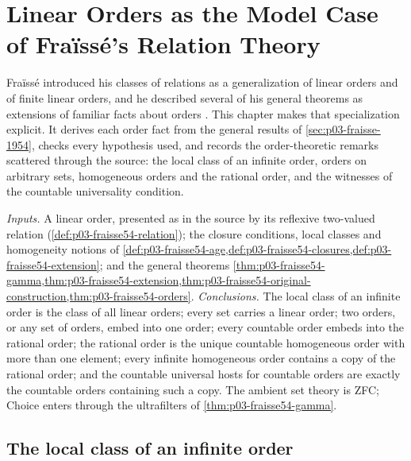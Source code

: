 \chapter{Linear Orders as the Model Case of Fra\"iss\'e's Relation Theory}
\label{sec:p03-w03-p03-014-orders}

Fra\"iss\'e introduced his classes of relations as a generalization of
linear orders and of finite linear orders, and he described several of his
general theorems as extensions of familiar facts about orders
\cite[\S1.1, pp.~363--364]{Fraisse1954}. This chapter makes that
specialization explicit. It derives each order fact from the general
results of \cref{sec:p03-fraisse-1954}, checks every hypothesis used, and
records the order-theoretic remarks scattered through the source:
the local class of an infinite order, orders on arbitrary sets,
homogeneous orders and the rational order, and the witnesses of the
countable universality condition.

\emph{Inputs.} A linear order, presented as in the source by its reflexive
two-valued relation (\cref{def:p03-fraisse54-relation}); the closure
conditions, local classes and homogeneity notions of
\cref{def:p03-fraisse54-age,def:p03-fraisse54-closures,def:p03-fraisse54-extension};
and the general theorems \cref{thm:p03-fraisse54-gamma,thm:p03-fraisse54-extension,thm:p03-fraisse54-original-construction,thm:p03-fraisse54-orders}.
\emph{Conclusions.} The local class of an infinite order is the class of
all linear orders; every set carries a linear order; two orders, or any
set of orders, embed into one order; every countable order embeds into
the rational order; the rational order is the unique countable homogeneous
order with more than one element; every infinite homogeneous order contains
a copy of the rational order; and the countable universal hosts for
countable orders are exactly the countable orders containing such a copy.
The ambient set theory is ZFC; Choice enters through the ultrafilters of
\cref{thm:p03-fraisse54-gamma}.

\section{The local class of an infinite order}
\label{sec:p03-w03-p03-014-local-class}

